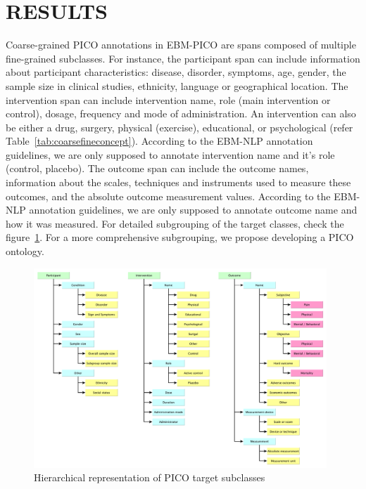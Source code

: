 \documentclass[10.7pt,]{article}
\begin{document}
\section{RESULTS}\label{results}
%
Coarse-grained PICO annotations in EBM-PICO are spans composed of multiple fine-grained subclasses.
For instance, the participant span can include information about participant characteristics: disease, disorder, symptoms, age, gender, the sample size in clinical studies, ethnicity, language or geographical location.
The intervention span can include intervention name, role (main intervention or control), dosage, frequency and mode of administration.
An intervention can also be either a drug, surgery, physical (exercise), educational, or psychological (refer Table~\ref{tab:coarsefineconcept}).
According to the EBM-NLP annotation guidelines, we are only supposed to annotate intervention name and it's role (control, placebo).
The outcome span can include the outcome names, information about the scales, techniques and instruments used to measure these outcomes, and the absolute outcome measurement values.
According to the EBM-NLP annotation guidelines, we are only supposed to annotate outcome name and how it was measured.
For detailed subgrouping of the target classes, check the figure~\ref{fig:target_subgroups}.
For a more comprehensive subgrouping, we propose developing a PICO ontology.
%
\begin{figure}[ht]
\centering
\includegraphics[width=0.98\textwidth]{figures/target_subgroups.pdf}
\caption{\label{fig:target_subgroups} Hierarchical representation of PICO target subclasses}
\end{figure}
%
%
%
\end{document}
